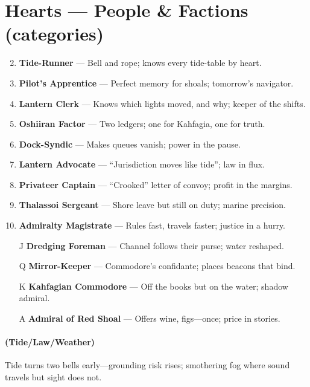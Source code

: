 \section*{Hearts --- People \& Factions (categories)}
\label{sec:kahfagia-people}
\begin{enumerate}
\setcounter{enumi}{1}
\item \textbf{Tide-Runner} --- Bell and rope; knows every tide-table by heart.
\item \textbf{Pilot's Apprentice} --- Perfect memory for shoals; tomorrow's navigator.
\item \textbf{Lantern Clerk} --- Knows which lights moved, and why; keeper of the shifts.
\item \textbf{Oshiiran Factor} --- Two ledgers; one for Kahfagia, one for truth.
\item \textbf{Dock-Syndic} --- Makes queues vanish; power in the pause.
\item \textbf{Lantern Advocate} --- ``Jurisdiction moves like tide''; law in flux.
\item \textbf{Privateer Captain} --- ``Crooked'' letter of convoy; profit in the margins.
\item \textbf{Thalassoi Sergeant} --- Shore leave but still on duty; marine precision.
\item \textbf{Admiralty Magistrate} --- Rules fast, travels faster; justice in a hurry.
\item[J] \textbf{Dredging Foreman} --- Channel follows their purse; water reshaped.
\item[Q] \textbf{Mirror-Keeper} --- Commodore's confidante; places beacons that bind.
\item[K] \textbf{Kahfagian Commodore} --- Off the books but on the water; shadow admiral.
\item[A] \textbf{Admiral of Red Shoal} --- Offers wine, figs---once; price in stories.
\end{enumerate}

\paragraph*{(Tide/Law/Weather)} Tide turns two bells early---grounding risk rises; smothering fog where sound travels but sight does not.

